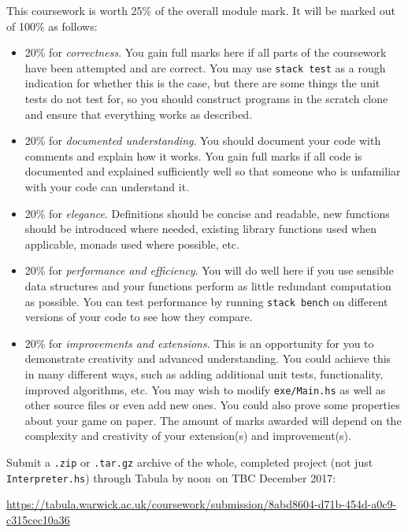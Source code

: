 \documentclass{cs256-shared/cs256}
\newcommand{\deadlineTime}{noon}
\newcommand{\deadlineDate}{TBC December 2017}
\newcommand{\submissionURL}{https://tabula.warwick.ac.uk/coursework/submission/8abd8604-d71b-454d-a0c9-c315cec10a36}
\begin{document}
This coursework is worth 25\% of the overall module mark. It will be marked out of 100\% as follows:
\begin{itemize}
	\item 20\% for \emph{correctness}. You gain full marks here if all parts of the coursework have been attempted and are correct. You may use \texttt{stack test} as a rough indication for whether this is the case, but there are some things the unit tests do not test for, so you should construct programs in the scratch clone and ensure that everything works as described.
	\item 20\% for \emph{documented understanding}. You should document your code with comments and explain how it works. You gain full marks if all code is documented and explained sufficiently well so that someone who is unfamiliar with your code can understand it.
	\item 20\% for \emph{elegance}. Definitions should be concise and readable, new functions should be introduced where needed, existing library functions used when applicable, monads used where possible, etc. 
	\item 20\% for \emph{performance and efficiency}. You will do well here if you use sensible data structures and your functions perform as little redundant computation as possible. You can test performance by running \texttt{stack bench} on different versions of your code to see how they compare. 
	\item 20\% for \emph{improvements and extensions}. This is an opportunity for you to demonstrate creativity and advanced understanding. You could achieve this in many different ways, such as adding additional unit tests, functionality, improved algorithms, etc. You may wish to modify \texttt{exe/Main.hs} as well as other source files or even add new ones. You could also prove some properties about your game on paper. The amount of marks awarded will depend on the complexity and creativity of your extension(s) and improvement(s).
\end{itemize}
Submit a \texttt{.zip} or \texttt{.tar.gz} archive of the whole, completed project (not just \texttt{Interpreter.hs}) through Tabula by \deadlineTime\ on \deadlineDate:

\begin{center} 
\url{\submissionURL}
\end{center}
\end{document}
